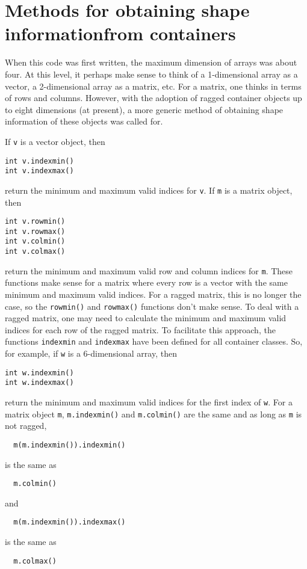 \section{Methods for obtaining shape information\br from containers}

When this code was first written, the maximum dimension of arrays
was about four. At this level, it perhaps make sense to think of
a 1-dimensional array as a vector, a 2-dimensional array as
a matrix, etc. For a matrix, one thinks in terms of rows and columns.
However, with the adoption of ragged container objects up to
eight dimensions (at present), a more generic method of obtaining
shape information of these objects was called for.

If \texttt{v} is a vector object, then
\begin{lstlisting}
int v.indexmin()
int v.indexmax()
\end{lstlisting}
return the minimum and maximum valid indices for \texttt{v}.
If \texttt{m} is a matrix object, then
\begin{lstlisting}
int v.rowmin()
int v.rowmax()
int v.colmin()
int v.colmax()
\end{lstlisting}
return the minimum and maximum valid row and column indices
for \texttt{m}. These functions make sense for a matrix where every
row is a vector with the same minimum and maximum valid
indices.  For a ragged matrix, this is no longer the case, so
the \texttt{rowmin()} and \texttt{rowmax()} functions don't make sense.
To deal with a ragged matrix, one may need to calculate
the minimum and maximum valid indices for each row of the ragged matrix. 
To facilitate this approach, the functions \texttt{indexmin} and 
\texttt{indexmax} have been defined for all container classes.  So,
for example, if \texttt{w} is a 6-dimensional array, then
\begin{lstlisting}
int w.indexmin()
int w.indexmax()
\end{lstlisting}
return the minimum and maximum valid indices for the first
index of \texttt{w}. For a matrix object \texttt{m},
\texttt{m.indexmin()} and \texttt{m.colmin()} are the same
and as long as \texttt{m} is not ragged, 
\begin{lstlisting}
  m(m.indexmin()).indexmin()
\end{lstlisting}
is the same as
\begin{lstlisting}
  m.colmin()
\end{lstlisting}
and 
\begin{lstlisting}
  m(m.indexmin()).indexmax()
\end{lstlisting}
is the same as
\begin{lstlisting}
  m.colmax()
\end{lstlisting}


